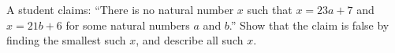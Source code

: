 A student claims: ``There is no natural number $x$ such that $x=23a+7$ and $x=21b+6$ for some natural numbers $a$ and $b$.'' Show that the claim is false by finding the smallest such $x$, and describe all such $x$.
